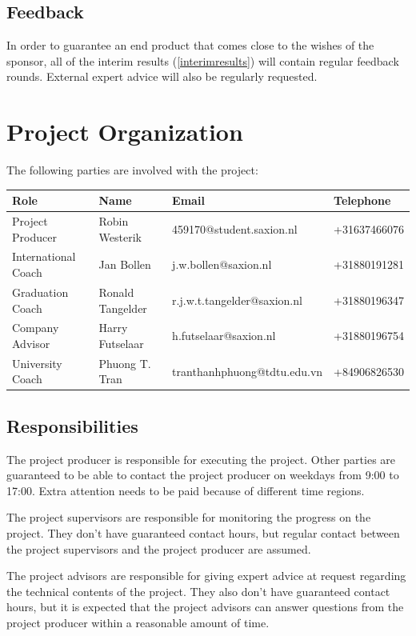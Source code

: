 \documentclass[11pt, a4paper]{article}
\begin{document}
\subsection{Feedback}
In order to guarantee an end product that comes close to the wishes of the sponsor, all of the interim results (\ref{interimresults}) will contain regular feedback rounds. External expert advice will also be regularly requested.
\pagebreak
\section{Project Organization}\label{projectorganization}
The following parties are involved with the project:\\

\begin{tabular}{ | l | l | l | l |}
    \hline
    \textbf{Role} & \textbf{Name} & \textbf{Email} & \textbf{Telephone} \\ \hline
    Project Producer & Robin Westerik & 459170@student.saxion.nl & +31637466076 \\
    International Coach & Jan Bollen & j.w.bollen@saxion.nl & +31880191281\\
    Graduation Coach & Ronald Tangelder & r.j.w.t.tangelder@saxion.nl & +31880196347\\
    Company Advisor & Harry Futselaar & h.futselaar@saxion.nl & +31880196754\\
    University Coach & Phuong T. Tran & tranthanhphuong@tdtu.edu.vn & +84906826530\\
    \hline
\end{tabular}

\subsection{Responsibilities}
The project producer is responsible for executing the project. Other parties are guaranteed to be able to contact the project producer on weekdays from 9:00 to 17:00. Extra attention needs to be paid because of different time regions.

The project supervisors are responsible for monitoring the progress on the project. They don't have guaranteed contact hours, but regular contact between the project supervisors and the project producer are assumed.

The project advisors are responsible for giving expert advice at request regarding the technical contents of the project. They also don't have guaranteed contact hours, but it is expected that the project advisors can answer questions from the project producer within a reasonable amount of time.
\end{document}
